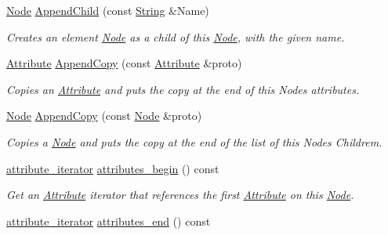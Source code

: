 \begin{DoxyCompactItemize}
\hyperlink{classphys_1_1xml_1_1Node}{Node} \hyperlink{classphys_1_1xml_1_1Node_ae5a3f39b69cf5097ff9c527430523f5b}{AppendChild} (const \hyperlink{namespacephys_1_1xml_a4d8ca7638328d16d303e5a4c849f4704}{String} \&Name)
\begin{DoxyCompactList}\small\item\em Creates an element \hyperlink{classphys_1_1xml_1_1Node}{Node} as a child of this \hyperlink{classphys_1_1xml_1_1Node}{Node}, with the given name. \item\end{DoxyCompactList}\item 
\hyperlink{classphys_1_1xml_1_1Attribute}{Attribute} \hyperlink{classphys_1_1xml_1_1Node_a33de8cdb7ed8694acac79aedc81523c9}{AppendCopy} (const \hyperlink{classphys_1_1xml_1_1Attribute}{Attribute} \&proto)
\begin{DoxyCompactList}\small\item\em Copies an \hyperlink{classphys_1_1xml_1_1Attribute}{Attribute} and puts the copy at the end of this Nodes attributes. \item\end{DoxyCompactList}\item 
\hyperlink{classphys_1_1xml_1_1Node}{Node} \hyperlink{classphys_1_1xml_1_1Node_a8b7872e4baf76dd5d19aa4f8d2b1a44d}{AppendCopy} (const \hyperlink{classphys_1_1xml_1_1Node}{Node} \&proto)
\begin{DoxyCompactList}\small\item\em Copies a \hyperlink{classphys_1_1xml_1_1Node}{Node} and puts the copy at the end of the list of this Nodes Childrem. \item\end{DoxyCompactList}\item 
\hyperlink{classphys_1_1xml_1_1AttributeIterator}{attribute\_\-iterator} \hyperlink{classphys_1_1xml_1_1Node_a9ede8da51d334d31167a6740e233c103}{attributes\_\-begin} () const 
\begin{DoxyCompactList}\small\item\em Get an \hyperlink{classphys_1_1xml_1_1Attribute}{Attribute} iterator that references the first \hyperlink{classphys_1_1xml_1_1Attribute}{Attribute} on this \hyperlink{classphys_1_1xml_1_1Node}{Node}. \item\end{DoxyCompactList}\item 
\hyperlink{classphys_1_1xml_1_1AttributeIterator}{attribute\_\-iterator} \hyperlink{classphys_1_1xml_1_1Node_ac2535dd3ebc22454993f09fb66ace134}{attributes\_\-end} () const 

\end{DoxyCompactItemize}
